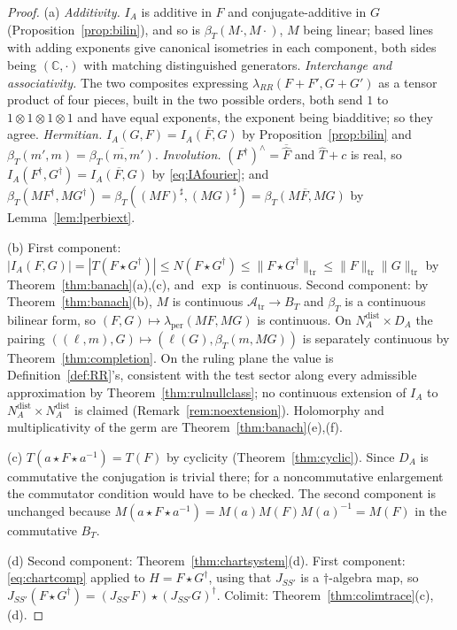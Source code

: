 \documentclass[11pt]{amsart}
\theoremstyle{definition}
\theoremstyle{remark}
\newcommand{\C}{\mathbb C}
\newcommand{\Th}{\widehat{T}}
\newcommand{\DA}{D_A}
\newcommand{\Atr}{\mathcal A_{\mathrm{tr}}}
\newcommand{\BT}{B_T}
\newcommand{\NAd}{N_A^{\mathrm{dist}}}
\begin{document}
\begin{proof}
(a)  \emph{Additivity.}  $I_A$ is additive in $F$ and conjugate-additive in $G$
(Proposition~\ref{prop:bilin}), and so is $\beta_T(M\cdot,M\cdot)$, $M$ being
linear; based lines with adding exponents give canonical isometries in each
component, both sides being $(\C,\cdot)$ with matching distinguished
generators.  \emph{Interchange and associativity.}  The two composites
expressing $\lambda_{RR}(F+F',G+G')$ as a tensor product of four pieces, built
in the two possible orders, both send $1$ to $1\otimes1\otimes1\otimes1$ and
have equal exponents, the exponent being biadditive; so they agree.
\emph{Hermitian.}  $I_A(G,F)=\overline{I_A(F,G)}$ by
Proposition~\ref{prop:bilin} and $\beta_T(m',m)=\overline{\beta_T(m,m')}$.
\emph{Involution.}  $(F^{\dagger})^{\wedge}=\overline{\widehat F}$ and $\Th+c$
is real, so $I_A(F^{\dagger},G^{\dagger})=\overline{I_A(F,G)}$ by
\eqref{eq:IAfourier}; and
$\beta_T(MF^{\dagger},MG^{\dagger})=\beta_T((MF)^{\sharp},(MG)^{\sharp})=
\overline{\beta_T(MF,MG)}$ by Lemma~\ref{lem:lperbiext}.

(b)  First component:
$|I_A(F,G)|=|T(F\star G^{\dagger})|\le N(F\star G^{\dagger})\le
\lVert F\star G^{\dagger}\rVert_{\mathrm{tr}}\le\lVert F\rVert_{\mathrm{tr}}
\lVert G\rVert_{\mathrm{tr}}$ by Theorem~\ref{thm:banach}(a),(c), and $\exp$ is
continuous.  Second component: by Theorem~\ref{thm:banach}(b), $M$ is
continuous $\Atr\to\BT$ and $\beta_T$ is a continuous bilinear form, so
$(F,G)\mapsto\lambda_{\mathrm{per}}(MF,MG)$ is continuous.  On
$\NAd\times\DA$ the pairing $((\ell,m),G)\mapsto(\ell(G),\beta_T(m,MG))$ is
separately continuous by Theorem~\ref{thm:completion}.  On the ruling plane the
value is Definition~\ref{def:RR}'s, consistent with the test sector along every
admissible approximation by Theorem~\ref{thm:rulnullclass}; no continuous
extension of $I_A$ to $\NAd\times\NAd$ is claimed
(Remark~\ref{rem:noextension}).  Holomorphy and multiplicativity of the germ are
Theorem~\ref{thm:banach}(e),(f).

(c)  $T(a\star F\star a^{-1})=T(F)$ by cyclicity
(Theorem~\ref{thm:cyclic}).  Since $\DA$ is commutative the conjugation is
trivial there; for a noncommutative enlargement the commutator condition
would have to be checked.  The second component is unchanged because
$M(a\star F\star a^{-1})=M(a)M(F)M(a)^{-1}=M(F)$ in the commutative $\BT$.

(d)  Second component: Theorem~\ref{thm:chartsystem}(d).  First component:
\eqref{eq:chartcomp} applied to $H=F\star G^{\dagger}$, using that $J_{SS'}$ is a
$\dagger$-algebra map, so $J_{SS'}(F\star G^{\dagger})=(J_{SS'}F)\star
(J_{SS'}G)^{\dagger}$.  Colimit: Theorem~\ref{thm:colimtrace}(c),(d).


\end{proof}
\end{document}
